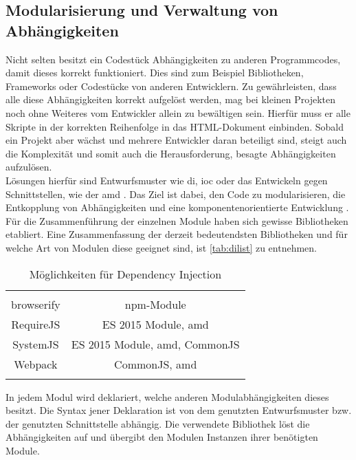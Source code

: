 \subsection{Modularisierung und Verwaltung von Abhängigkeiten}
Nicht selten besitzt ein Codestück Abhängigkeiten zu anderen Programmcodes, damit dieses korrekt funktioniert. Dies sind zum Beispiel Bibliotheken, Frameworks oder Codestücke von anderen Entwicklern. Zu gewährleisten, dass alle diese Abhängigkeiten korrekt aufgelöst werden, mag bei kleinen Projekten noch ohne Weiteres vom Entwickler allein zu bewältigen sein. Hierfür muss er alle Skripte in der korrekten Reihenfolge in das HTML-Dokument einbinden. Sobald ein Projekt aber wächst und mehrere Entwickler daran beteiligt sind, steigt auch die Komplexität und somit auch die Herausforderung, besagte Abhängigkeiten aufzulösen. \\
Lösungen hierfür sind Entwurfsmuster wie \ac{di}, \ac{ioc} \cite[S. 25 ff.]{GollDausmann2013} oder das Entwickeln gegen Schnittstellen, wie der \ac{amd} \cite[S. 266 ff.]{ste15}. Das Ziel ist dabei, den Code zu modularisieren, die Entkopplung von Abhängigkeiten und eine komponentenorientierte Entwicklung \cite[S. 261]{ste15}. Für die Zusammenführung der einzelnen Module haben sich gewisse Bibliotheken etabliert. Eine Zusammenfassung der derzeit bedeutendsten Bibliotheken und für welche Art von Modulen diese geeignet sind, ist \autoref{tab:dilist} zu entnehmen.

\begin{minipage}{\textwidth}
\begin{longtable}{|c|c|}
	\hline  
	\thead{Bibliothek} & \thead{Geeignet für}\\  \hhline{|=|=|}
	browserify &  npm-Module \\
	\hline
	RequireJS & ES 2015 Module, \ac{amd}   \\ 
	\hline 
	SystemJS &  ES 2015 Module, \ac{amd}, CommonJS  \\ 
	\hline 
	Webpack & CommonJS, \ac{amd}   \\ 
	\hline 
	
	\caption{Möglichkeiten für Dependency Injection}\label{tab:dilist}
\end{longtable}
\end{minipage}


In jedem Modul wird deklariert, welche anderen Modulabhängigkeiten dieses besitzt. Die Syntax jener Deklaration ist von dem genutzten Entwurfsmuster bzw. der genutzten Schnittstelle abhängig. Die verwendete Bibliothek löst die Abhängigkeiten auf und übergibt den Modulen Instanzen ihrer benötigten Module. 